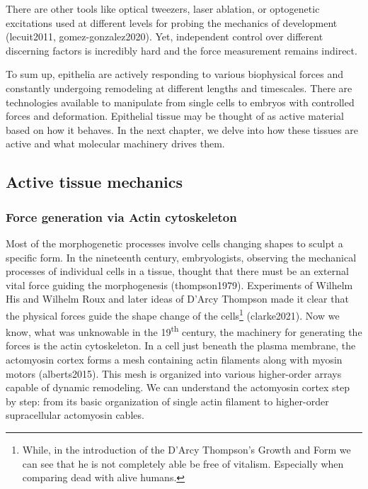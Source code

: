 \documentclass[
]{article}
\begin{document}
There are other tools like optical tweezers, laser ablation, or
optogenetic excitations used at different levels for probing the
mechanics of development (lecuit2011, gomez-gonzalez2020). Yet,
independent control over different discerning factors is incredibly hard
and the force measurement remains indirect.

To sum up, epithelia are actively responding to various biophysical
forces and constantly undergoing remodeling at different lengths and
timescales. There are technologies available to manipulate from single
cells to embryos with controlled forces and deformation. Epithelial
tissue may be thought of as active material based on how it behaves. In
the next chapter, we delve into how these tissues are active and what
molecular machinery drives them.

\hypertarget{active-tissue-mechanics-1}{%
\subsection{Active tissue mechanics}\label{active-tissue-mechanics-1}}

\hypertarget{force-generation-via-actin-cytoskeleton}{%
\subsubsection{Force generation via Actin
cytoskeleton}\label{force-generation-via-actin-cytoskeleton}}

Most of the morphogenetic processes involve cells changing shapes to
sculpt a specific form. In the nineteenth century, embryologists,
observing the mechanical processes of individual cells in a tissue,
thought that there must be an external vital force guiding the
morphogenesis (thompson1979). Experiments of Wilhelm His and Wilhelm
Roux and later ideas of D'Arcy Thompson made it clear that the physical
forces guide the shape change of the cells\footnote{While, in the
  introduction of the D'Arcy Thompson's Growth and Form we can see that
  he is not completely able be free of vitalism. Especially when
  comparing dead with alive humans.} (clarke2021). Now we know, what was
unknowable in the 19\textsuperscript{th} century, the machinery for
generating the forces is the actin cytoskeleton. In a cell just beneath
the plasma membrane, the actomyosin cortex forms a mesh containing actin
filaments along with myosin motors (alberts2015). This mesh is organized
into various higher-order arrays capable of dynamic remodeling. We can
understand the actomyosin cortex step by step: from its basic
organization of single actin filament to higher-order supracellular
actomyosin cables.
\end{document}
